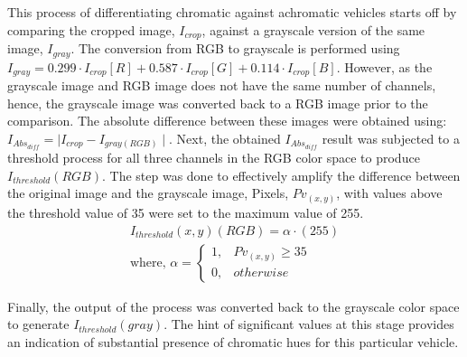 This process of differentiating chromatic against achromatic vehicles starts off by comparing the cropped image, $I_{crop}$, against a grayscale version of the same image, $I_{gray}$. The conversion from RGB to grayscale is performed using $I_{gray} = 0.299 \cdot I_{crop}[R]+0.587 \cdot I_{crop}[G]+0.114 \cdot I_{crop}[B]$. However, as the grayscale image and RGB image does not have the same number of channels, hence, the grayscale image was converted back to a RGB image prior to the comparison.
The absolute difference between these images were obtained using: $I_{Abs_{diff}} = \mid I_{crop} - I_{gray(RGB)} \mid$. Next, the obtained $I_{Abs_{diff}}$ result was subjected to a threshold process for all three channels in the RGB color space to produce $I_{threshold}(RGB)$. 
The step was done to effectively amplify the difference between the original image and the grayscale image, Pixels, $Pv_{(x,y)}$, with values above the threshold value of 35 were set to the maximum value of 255. 
\begin{align*}
\label{eq:threshabsolutediff}
I_{threshold}(x,y)(RGB) = \alpha \cdot (255) \\
\text{where, } 
\alpha = 
\begin{cases}
1, & Pv_{(x,y)} \geq 35\\
0, & otherwise
\end{cases}
\end{align*}

 Finally, the output of the process was converted back to the grayscale color space to generate $I_{threshold}(gray)$. The hint of significant values at this stage provides an indication of substantial presence of chromatic hues for this particular vehicle.     


